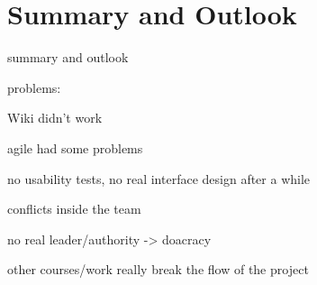 \chapter{Summary and Outlook}\label{chap:summaryAndOutlook}

summary and outlook

problems:

Wiki didn't work

agile had some problems

no usability tests, no real interface design after a while

conflicts inside the team

no real leader/authority -> doacracy

other courses/work really break the flow of the project